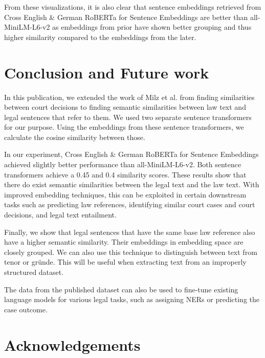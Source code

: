 \documentclass[runningheads]{llncs}
\begin{document}
From these visualizations, it is also clear that sentence embeddings retrieved from Cross English \& German RoBERTa for Sentence Embeddings are better than all-MiniLM-L6-v2 as embeddings from prior have shown better grouping and thus higher similarity compared to the embeddings from the later. 


\section{Conclusion and Future work}
\label{sec:conclusion}

In this publication, we extended the work of Milz et al. \cite{milz2021analysis} from finding similarities between court decisions to finding semantic similarities between law text and legal sentences that refer to them. We used two separate sentence transformers for our purpose. Using the embeddings from these sentence transformers, we calculate the cosine similarity between those.

In our experiment, Cross English \& German RoBERTa for Sentence Embeddings achieved slightly better performance than all-MiniLM-L6-v2. Both sentence transformers achieve a 0.45 and 0.4 similarity scores. These results show that there do exist semantic similarities between the legal text and the law text. With improved embedding techniques, this can be exploited in certain downstream tasks such as predicting law references, identifying similar court cases and court decisions, and legal text entailment.

Finally, we show that legal sentences that have the same base law reference also have a higher semantic similarity. Their embeddings in embedding space are closely grouped. We can also use this technique to distinguish between text from tenor or gründe. This will be useful when extracting text from an improperly structured dataset.

The data from the published dataset can also be used to fine-tune existing language models for various legal tasks, such as assigning NERs or predicting the case outcome.


\section{Acknowledgements}
\end{document}
